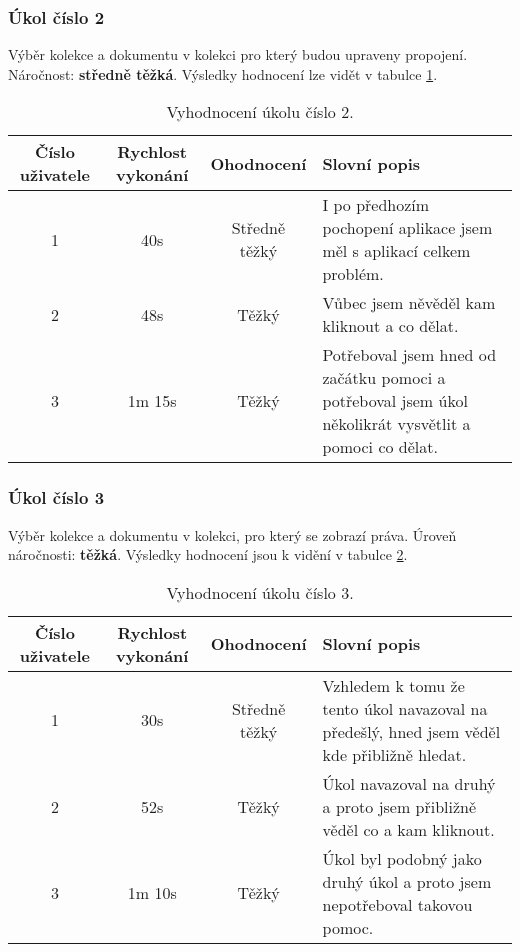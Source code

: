 \subsubsection{Úkol číslo 2} Výběr kolekce a dokumentu v kolekci pro který budou upraveny propojení. Náročnost: \textbf{středně těžká}. Výsledky hodnocení lze vidět v tabulce \ref{ukol-2}.
\begin{table}[htp]
\begin{center}
\begin{tabular}{ || c || c | c | m{5cm} || }
\hline
Číslo uživatele & Rychlost vykonání & Ohodnocení & Slovní popis \\ [0.5ex]
\hline
\hline
1 & 40s & Středně těžký & I po předhozím pochopení aplikace jsem měl s aplikací celkem problém.\\
\hline
2 & 48s & Těžký & Vůbec jsem něvěděl kam kliknout a co dělat. \\
\hline
3 & 1m 15s & Těžký & Potřeboval jsem hned od začátku pomoci a potřeboval jsem úkol několikrát vysvětlit a pomoci co dělat. \\
\hline
\end{tabular}
\end{center}
\caption{Vyhodnocení úkolu číslo 2.}
\label{ukol-2}
\end{table}
\subsubsection{Úkol číslo 3} Výběr kolekce a dokumentu v kolekci, pro který se zobrazí práva. Úroveň náročnosti: \textbf{těžká}. Výsledky hodnocení jsou k vidění v tabulce \ref{ukol-3}.
\begin{table}[htp]
\begin{center}
\begin{tabular}{ || c || c | c | m{5cm} || }
\hline
Číslo uživatele & Rychlost vykonání & Ohodnocení & Slovní popis \\ [0.5ex]
\hline
\hline
1 & 30s & Středně těžký & Vzhledem k tomu že tento úkol navazoval na předešlý, hned jsem věděl kde přibližně hledat. \\
\hline
2 & 52s & Těžký & Úkol navazoval na druhý a proto jsem přibližně věděl co a kam kliknout. \\
\hline
3 & 1m 10s & Těžký & Úkol byl podobný jako druhý úkol a proto jsem nepotřeboval takovou pomoc. \\
\hline
\end{tabular}
\end{center}
\caption{Vyhodnocení úkolu číslo 3.}
\label{ukol-3}
\end{table}

